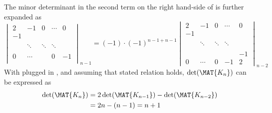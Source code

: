 The minor determinant in the second term on the right hand-side of  is further expanded as
\begin{equation}
	\begin{vmatrix}
		2  & -1      &  0     & \cdots  & 0\\
		-1 &         &        &         &   \\
		   &         &        &         &   \\
		   & \ddots  & \ddots & \ddots  &   \\
		   &         &        &         &   \\
		 0 & \cdots  &        &       0 & -1\\
	\end{vmatrix}_{n-1} = 
	(-1)\cdot(-1)^{n-1+n-1}
	\begin{vmatrix}
		2  & -1      &  0     & \cdots  & 0\\
		-1 &         &        &         &   \\
		   &         &        &         &   \\
		   & \ddots  & \ddots & \ddots  &   \\
		   &         &        &         &   \\
		   &         &        &         & -1\\
		0  & \cdots  &  0     &   -1    & 2
	\end{vmatrix}_{n-2}
	\label{eq:term2exp}
\end{equation}
With  plugged in , and assuming that stated relation holds, $\det(\MAT{K_n})$ can be expressed as
\begin{align}
	\det(\MAT{K_n}) &= 2 \det(\MAT{K_{n-1}}) - \det(\MAT{K_{n-2}})\\
					&= 2n - (n-1) = n+1
\end{align}